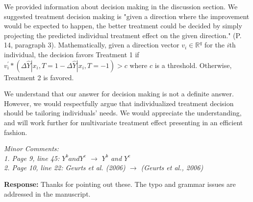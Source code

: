 \documentclass[11pt]{article}
\begin{document}
We provided information about decision making in the discussion section. We suggested treatment decision making is "given a direction where the improvement would be expected to happen, the better treatment could be decided by simply projecting the predicted individual treatment effect on the given direction." (P. 14, paragraph 3). Mathematically, given a direction vector $v_i \in \mathbb{R}^q$ for the $i$th individual, the decision favors Treatment 1 if $v_i^\prime*(\Delta \hat Y|x_i, T=1 - \Delta \hat Y|x_i, T=-1) > c$ where $c$ is a threshold. Otherwise, Treatment 2 is favored.


We understand that our answer for decision making is not a definite answer. However, we would respectfully argue that individualized treatment decision should be tailoring individuals' needs. We would appreciate the understanding, and will work further for multivariate treatment effect presenting in an efficient fashion.

\bigskip

{\em Minor Comments:}\\
{\em 
1. Page 9, line 45: $Y^b and Y^e$ $\rightarrow$ $Y^b$ and $Y^e$\\
2. Page 10, line 22: Geurts et al. (2006) $\rightarrow$ (Geurts et al., 2006)
}

\medskip

\textbf{Response:} Thanks for pointing out these. The typo and grammar issues are addressed in the manuscript.




\end{document}
